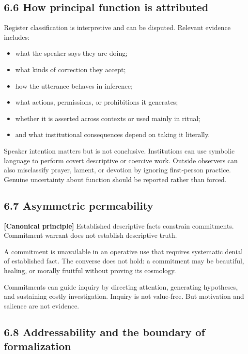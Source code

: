 \documentclass[
  11pt,
]{article}
\providecommand{\tightlist}{%
  \setlength{\itemsep}{0pt}\setlength{\parskip}{0pt}}
\begin{document}
\subsection{6.6 How principal function is
attributed}\label{how-principal-function-is-attributed}

Register classification is interpretive and can be disputed. Relevant
evidence includes:

\begin{itemize}
\tightlist
\item
  what the speaker says they are doing;
\item
  what kinds of correction they accept;
\item
  how the utterance behaves in inference;
\item
  what actions, permissions, or prohibitions it generates;
\item
  whether it is asserted across contexts or used mainly in ritual;
\item
  and what institutional consequences depend on taking it literally.
\end{itemize}

Speaker intention matters but is not conclusive. Institutions can use
symbolic language to perform covert descriptive or coercive work.
Outside observers can also misclassify prayer, lament, or devotion by
ignoring first-person practice. Genuine uncertainty about function
should be reported rather than forced.

\subsection{6.7 Asymmetric permeability}\label{asymmetric-permeability}

\textbf{{[}Canonical principle{]}} Established descriptive facts
constrain commitments. Commitment warrant does not establish descriptive
truth.

A commitment is unavailable in an operative use that requires systematic
denial of established fact. The converse does not hold: a commitment may
be beautiful, healing, or morally fruitful without proving its
cosmology.

Commitments can guide inquiry by directing attention, generating
hypotheses, and sustaining costly investigation. Inquiry is not
value-free. But motivation and salience are not evidence.

\subsection{6.8 Addressability and the boundary of
formalization}\label{addressability-and-the-boundary-of-formalization}
\end{document}

